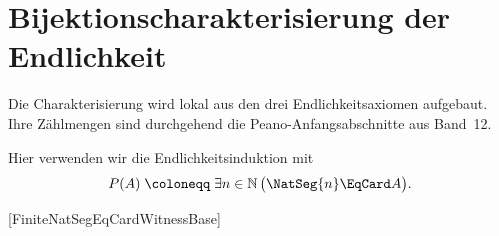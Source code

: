 \documentclass[main.tex]{subfiles}
\begin{document}
\section{Bijektionscharakterisierung der Endlichkeit}

Die Charakterisierung wird lokal aus den drei Endlichkeitsaxiomen aufgebaut.
Ihre Zählmengen sind durchgehend die Peano-Anfangsabschnitte aus Band~12.

Hier verwenden wir die Endlichkeitsinduktion mit
\[
  P(A)\;\coloneqq\;
  \exists n\in\mathbb{N}\,\bigl(\NatSeg{n}\EqCard A\bigr).
\]
\begin{tabproofsplitwide}
  [FiniteNatSegEqCardWitnessBase]
  \closeproofpartwideindR


\end{tabproofsplitwide}
\end{document}
